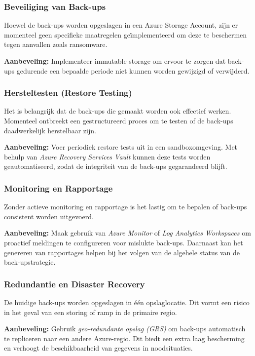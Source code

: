 \subsubsection{Beveiliging van Back-ups}
Hoewel de back-ups worden opgeslagen in een Azure Storage Account, zijn er momenteel geen specifieke maatregelen geïmplementeerd om deze te beschermen tegen aanvallen zoals ransomware.

\textbf{Aanbeveling:} Implementeer immutable storage om ervoor te zorgen dat back-ups gedurende een bepaalde periode niet kunnen worden gewijzigd of verwijderd. 

\subsubsection{Hersteltesten (Restore Testing)}
Het is belangrijk dat de back-ups die gemaakt worden ook effectief werken. Momenteel ontbreekt een gestructureerd proces om te testen of de back-ups daadwerkelijk herstelbaar zijn.

\textbf{Aanbeveling:} Voer periodiek restore tests uit in een sandboxomgeving. Met behulp van \textit{Azure Recovery Services Vault} kunnen deze tests worden geautomatiseerd, zodat de integriteit van de back-ups gegarandeerd blijft.

\subsubsection{Monitoring en Rapportage}
Zonder actieve monitoring en rapportage is het lastig om te bepalen of back-ups consistent worden uitgevoerd.

\textbf{Aanbeveling:} Maak gebruik van \textit{Azure Monitor} of \textit{Log Analytics Workspaces} om proactief meldingen te configureren voor mislukte back-ups. Daarnaast kan het genereren van rapportages helpen bij het volgen van de algehele status van de back-upstrategie.

\subsubsection{Redundantie en Disaster Recovery}
De huidige back-ups worden opgeslagen in één opslaglocatie. Dit vormt een risico in het geval van een storing of ramp in de primaire regio.

\textbf{Aanbeveling:} Gebruik \textit{geo-redundante opslag (GRS)} om back-ups automatisch te repliceren naar een andere Azure-regio. Dit biedt een extra laag bescherming en verhoogt de beschikbaarheid van gegevens in noodsituaties.

